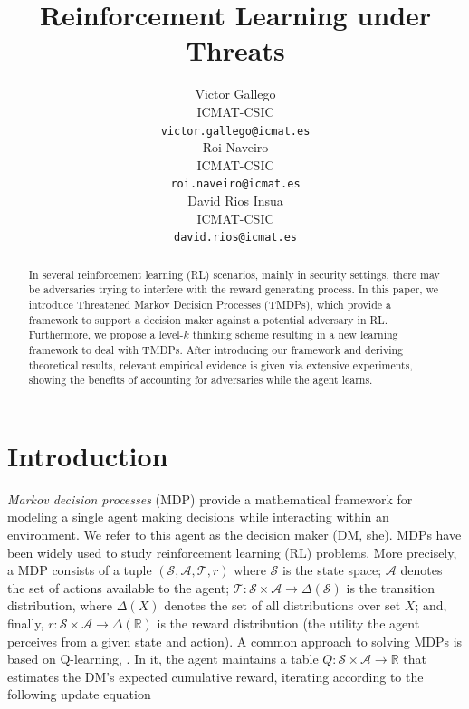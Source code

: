 \documentclass[letterpaper]{article} %
\begin{document}
%
\title{Reinforcement Learning under Threats}
\author{
Victor Gallego \\
  ICMAT-CSIC \\
  \texttt{victor.gallego@icmat.es} \\
   \And
   Roi Naveiro \\
  ICMAT-CSIC \\
   \texttt{roi.naveiro@icmat.es} \\
   \And
   David Rios Insua \\
   ICMAT-CSIC \\
   \texttt{david.rios@icmat.es} \\
}
\maketitle
\begin{abstract}
In several reinforcement learning (RL) scenarios, 
mainly in security settings, 
there may be adversaries trying to interfere with the reward generating process.
In this paper, we introduce Threatened Markov Decision Processes (TMDPs), 
which provide a framework to support a decision maker against a potential adversary
in RL. Furthermore, we propose a level-$k$ thinking scheme 
resulting in a new learning framework to deal with TMDPs. After introducing our framework and
deriving theoretical
results, relevant empirical evidence is given via extensive experiments, 
showing the benefits of accounting for adversaries while the agent learns.
\end{abstract}

\section{Introduction}

\textit{Markov decision processes} (MDP) \cite{howard:dp} provide 
a mathematical framework for modeling a single agent making decisions 
while interacting within an environment. We refer to this agent as the
decision maker (DM, she). MDPs have been widely used to study 
reinforcement learning (RL) problems. More precisely, a MDP consists of a tuple $\left( \mathcal{S}, \mathcal{A}, \mathcal{T}, r\right)$ where $\mathcal{S}$ is the state space; $\mathcal{A}$ denotes the set of actions available to the agent; $\mathcal{T}: \mathcal{S} \times \mathcal{A} \rightarrow \Delta (\mathcal{S})$ is the transition distribution, where $\Delta(X)$ denotes the set of all distributions over set $X$;
and, finally, $r : \mathcal{S} \times \mathcal{A}  \rightarrow \Delta(\mathbb{R}) $
is the reward distribution (the utility the agent perceives from a given state
and action). A common approach to solving MDPs is based on Q-learning, \cite{sutton1998reinforcement}. 
In it, the agent maintains a table $Q : \mathcal{S} \times \mathcal{A} \rightarrow \mathbb{R}$ that estimates the DM's expected cumulative reward, 
iterating according to the following update equation
\end{document}
